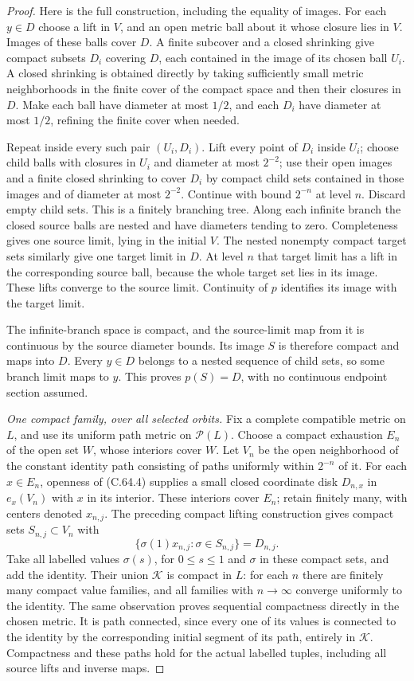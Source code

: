 \begin{proof}
Here is the full construction, including the equality of images.
For each $y\in D$ choose a lift in $V$, and an open metric ball
about it whose closure lies in $V$. Images of these balls cover
$D$. A finite subcover and a closed shrinking give compact
subsets $D_i$ covering $D$, each contained in the image of its
chosen ball $U_i$. A closed shrinking is obtained directly by
taking sufficiently small metric neighborhoods in the finite
cover of the compact space and then their closures in $D$.
Make each ball have diameter at most $1/2$, and each $D_i$
have diameter at most $1/2$, refining the finite cover when
needed.

Repeat inside every such pair $(U_i,D_i)$. Lift every point
of $D_i$ inside $U_i$; choose child balls with closures in
$U_i$ and diameter at most $2^{-2}$; use their open images
and a finite closed shrinking to cover $D_i$ by compact child
sets contained in those images and of diameter at most
$2^{-2}$. Continue with bound $2^{-n}$ at level $n$.
Discard empty child sets. This is a finitely branching tree.
Along each infinite branch the closed source balls are nested
and have diameters tending to zero. Completeness gives one
source limit, lying in the initial $V$. The nested nonempty
compact target sets similarly give one target limit in $D$.
At level $n$ that target limit has a lift in the corresponding
source ball, because the whole target set lies in its image.
These lifts converge to the source limit. Continuity of $p$
identifies its image with the target limit.

The infinite-branch space is compact, and the source-limit
map from it is continuous by the source diameter bounds.
Its image $S$ is therefore compact and maps into $D$.
Every $y\in D$ belongs to a nested sequence of child sets,
so some branch limit maps to $y$. This proves $p(S)=D$,
with no continuous endpoint section assumed.

\emph{One compact family, over all selected orbits.}
Fix a complete compatible metric on $L$, and use its uniform
path metric on $\mathscr P(L)$. Choose a compact exhaustion
$E_n$ of the open set $W$, whose interiors cover $W$.
Let $V_n$ be the open neighborhood of the constant identity
path consisting of paths uniformly within $2^{-n}$ of it.
For each $x\in E_n$, openness of (C.64.4) supplies a small
closed coordinate disk $D_{n,x}$ in $e_x(V_n)$ with $x$ in
its interior. These interiors cover $E_n$; retain finitely
many, with centers denoted $x_{n,j}$. The preceding compact
lifting construction gives compact sets
$S_{n,j}\subset V_n$ with
\[
 \{\sigma(1)x_{n,j}:\sigma\in S_{n,j}\}=D_{n,j}.          \tag{C.64.5}
\]
Take all labelled values $\sigma(s)$, for $0\leq s\leq1$
and $\sigma$ in these compact sets, and add the identity.
Their union $\mathcal K$ is compact in $L$: for each $n$
there are finitely many compact value families, and all
families with $n\to\infty$ converge uniformly to the identity.
The same observation proves sequential compactness directly
in the chosen metric. It is path connected, since every
one of its values is connected to the identity by the
corresponding initial segment of its path, entirely in
$\mathcal K$. Compactness and these paths hold for the
actual labelled tuples, including all source lifts and
inverse maps.


\end{proof}
